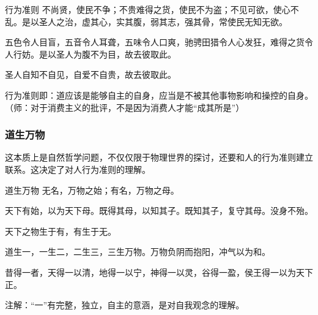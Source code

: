 \begin{fancybox}{行为准则}
    不尚贤，使民不争；不贵难得之货，使民不为盗；不见可欲，使心不乱。是以圣人之治，虚其心，实其腹，弱其志，强其骨，常使民无知无欲。
    
    五色令人目盲，五音令人耳聋，五味令人口爽，驰骋田猎令人心发狂，难得之货令人行妨。是以圣人为腹不为目，故去彼取此。
    
    圣人自知不自见，自爱不自贵，故去彼取此。
\end{fancybox}

行为准则即：道应该是能够自主的自身，应当是不被其他事物影响和操控的自身。（师：对于消费主义的批评，不是因为消费人才能“成其所是”）

\subsubsection{道生万物}

这本质上是自然哲学问题，不仅仅限于物理世界的探讨，还要和人的行为准则建立联系。这决定了对人行为准则的理解。

\begin{fancybox}{道生万物}
    无名，万物之始；有名，万物之母。
    
    天下有始，以为天下母。既得其母，以知其子。既知其子，复守其母。没身不殆。

    天下之物生于有，有生于无。

    道生一，一生二，二生三，三生万物。万物负阴而抱阳，冲气以为和。
       
    昔得一者，天得一以清，地得一以宁，神得一以灵，谷得一盈，侯王得一以为天下正。
\end{fancybox}

注解：“一”有完整，独立，自主的意涵，是对自我观念的理解。

